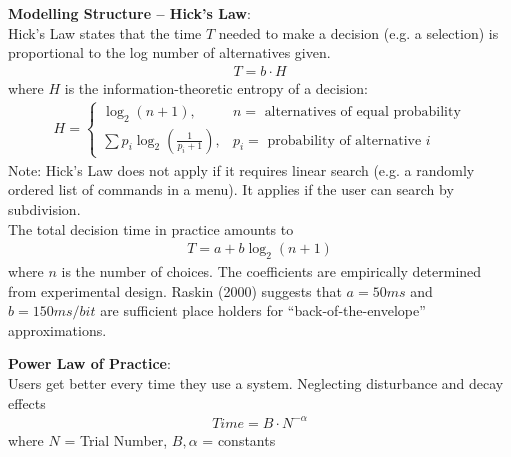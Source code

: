 \textbf{Modelling Structure -- Hick's Law}:\\
Hick's Law states that the time $T$ needed to make a decision (e.g. a selection) is proportional to the log number of alternatives given.
\begin{align*}
T = b \cdot H
\end{align*}
where $H$ is the information-theoretic entropy of a decision:
\begin{align*}
H = 
\begin{cases}
\log_2(n+1), & n = \text{ alternatives of equal probability}\\
\sum p_i \log_2(\frac{1}{p_i + 1}), & p_i = \text{ probability of alternative }i
\end{cases}
\end{align*}
Note: Hick's Law does not apply if it requires linear search (e.g. a randomly ordered list of commands in a menu). It applies if the user can search by subdivision.\\
The total decision time in practice amounts to 
\begin{align*}
T = a + b \log_2(n+1)
\end{align*}
where $n$ is the number of choices. The coefficients are empirically determined from experimental design. Raskin (2000) suggests that $a= 50 ms$ and $b=150 ms/bit$ are sufficient place holders for ``back-of-the-envelope'' approximations.

\textbf{Power Law of Practice}:\\
Users get better every time they use a system. Neglecting disturbance and decay effects
\begin{align*}
Time = B\cdot N^{-\alpha}
\end{align*}
where $N$ = Trial Number, $B, \alpha$ = constants

